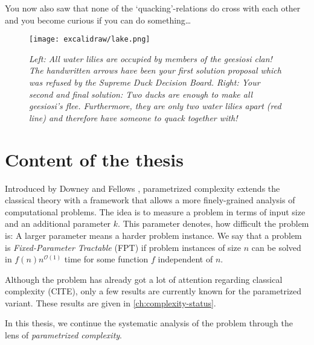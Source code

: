 You now also saw that none of the `quacking'-relations do cross with each other and you become curious if you can do something\ldots

\begin{figure}[ht]
    \centering
    \texttt{[image: excalidraw/lake.png]}
    \caption[Introductions: Merganser Lake. Own Drawing. Embedded icons under public domain from {\href{https://creazilla.com/}{https://creazilla.com/}}]{\textit{Left: All water lilies are occupied by members of the \textit{geesiosi} clan! The handwritten arrows have been your first solution proposal which was refused by the \textit{Supreme Duck Decision Board}.
    Right: Your second and final solution: Two ducks are enough to make all \textit{geesiosi}'s flee. Furthermore, they are only two water lilies apart (red line) and therefore have someone to quack together with!}}
    \label{fig:duck-lake}
\end{figure}

\section{Content of the thesis}

Introduced by Downey and Fellows \cite{Downey1999a}, parametrized complexity extends the classical theory with a framework that allows a more finely-grained analysis of computational problems. The idea is to measure a problem in terms of input size and an additional parameter $k$. This parameter denotes, how difficult the problem is: A larger parameter means a harder problem instance. We say that a problem is \textit{Fixed-Parameter Tractable} (FPT) if problem instances of size $n$ can be solved in $f(n)n^{\mathcal{O}(1)}$ time for some function $f$ independent of $n$. 

Although the \sdom problem has already got a lot of attention regarding classical complexity (CITE), only a few results are currently known for the parametrized variant. These results are given in \cref{ch:complexity-status}.

In this thesis, we continue the systematic analysis of the \sdom problem through the lens of \textit{parametrized complexity}. 

